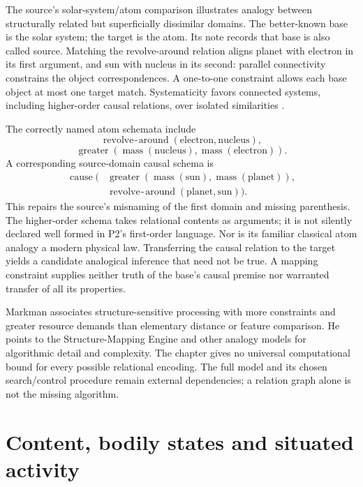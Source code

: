 The source's solar-system/atom comparison illustrates analogy
between structurally related but superficially dissimilar domains.
The better-known base is the solar system; the target is the atom.
Its note records that base is also called source. Matching the
revolve-around relation aligns planet with electron in its first
argument, and sun with nucleus in its second: parallel connectivity
constrains the object correspondences. A one-to-one constraint
allows each base object at most one target match. Systematicity
favors connected systems, including higher-order causal relations,
over isolated similarities
\cite[pp.~45--46 and note~1]{Markman2012CognitiveRepresentation}.

The correctly named atom schemata include
\[
 \operatorname{revolve\!-\!around}(\mathrm{electron},\mathrm{nucleus}),
\]
\[
 \operatorname{greater}(\operatorname{mass}(\mathrm{nucleus}),
                        \operatorname{mass}(\mathrm{electron})).
\]
A corresponding source-domain causal schema is
\[
\begin{aligned}
 \operatorname{cause}\bigl(&
 \operatorname{greater}(\operatorname{mass}(\mathrm{sun}),
                         \operatorname{mass}(\mathrm{planet})),\\
 &\operatorname{revolve\!-\!around}(\mathrm{planet},\mathrm{sun})\bigr).
\end{aligned}
\]
This repairs the source's misnaming of the first domain and missing
parenthesis. The higher-order schema takes relational contents as
arguments; it is not silently declared well formed in P2's
first-order language. Nor is its familiar classical atom analogy
a modern physical law. Transferring the causal relation to the
target yields a candidate analogical inference that need not be
true. A mapping constraint supplies neither truth of the base's
causal premise nor warranted transfer of all its properties.

Markman associates structure-sensitive processing with more
constraints and greater resource demands than elementary distance
or feature comparison. He points to the Structure-Mapping Engine
and other analogy models for algorithmic detail and complexity.
The chapter gives no universal computational bound for every
possible relational encoding. The full model and its chosen
search/control procedure remain external dependencies; a relation
graph alone is not the missing algorithm.

\section{Content, bodily states and situated activity}
\label{sec:p19-ckr-embodiment}


